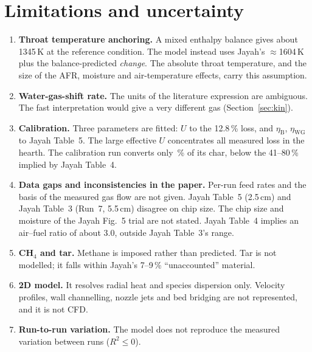 \documentclass[11pt,a4paper]{article}
\begin{document}
\section{Limitations and uncertainty}\label{sec:lim}
\begin{enumerate}
\item \textbf{Throat temperature anchoring.} A mixed enthalpy balance gives about 1345\,K at the reference condition. The model instead uses Jayah's $\approx$1604\,K plus the balance-predicted \emph{change}. The absolute throat temperature, and the size of the AFR, moisture and air-temperature effects, carry this assumption.
\item \textbf{Water-gas-shift rate.} The units of the literature expression are ambiguous. The fast interpretation would give a very different gas (Section~\ref{sec:kin}).
\item \textbf{Calibration.} Three parameters are fitted: $U$ to the 12.8\,\% loss, and $\eta_\text{B}$, $\eta_\text{WG}$ to Jayah Table~5. The large effective $U$ concentrates all measured loss in the hearth. The calibration run converts only \RCalXc\,\% of its char, below the 41--80\,\% implied by Jayah Table~4.
\item \textbf{Data gaps and inconsistencies in the paper.} Per-run feed rates and the basis of the measured gas flow are not given. Jayah Table~5 (2.5\,cm) and Jayah Table~3 (Run~7, 5.5\,cm) disagree on chip size. The chip size and moisture of the Jayah Fig.~5 trial are not stated. Jayah Table~4 implies an air--fuel ratio of about 3.0, outside Jayah Table~3's range.
\item \textbf{CH$_4$ and tar.} Methane is imposed rather than predicted. Tar is not modelled; it falls within Jayah's 7--9\,\% ``unaccounted'' material.
\item \textbf{2D model.} It resolves radial heat and species dispersion only. Velocity profiles, wall channelling, nozzle jets and bed bridging are not represented, and it is not CFD.
\item \textbf{Run-to-run variation.} The model does not reproduce the measured variation between runs ($R^2\le0$).
\end{enumerate}

\end{document}

